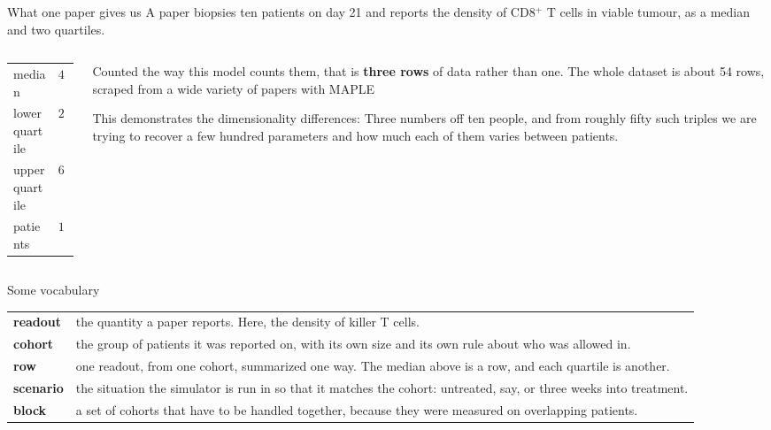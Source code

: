 \documentclass[10pt,aspectratio=169]{beamer}
\newcommand{\term}[1]{\alert{\textbf{#1}}}
\begin{document}
\begin{frame}[t]{What one paper gives us}
  A paper biopsies ten patients on day 21 and reports the density of CD8$^+$
  T cells in viable tumour, as a median and two quartiles.
  \vspace{0.4em}
  \begin{columns}[T]
    \begin{column}{0.33\textwidth}
      \begin{center}\small
      \begin{tabular}{@{}lr@{}}
        \toprule
        median & $4.1$ \\
        lower quartile & $2.8$ \\
        upper quartile & $6.0$ \\
        \midrule
        patients & $10$ \\
        \bottomrule
      \end{tabular}
      \end{center}
    \end{column}
    \begin{column}{0.62\textwidth}
      Counted the way this model counts them, that is \term{three rows} of data
      rather than one. The whole dataset is about 54 rows, scraped from a wide variety of papers with MAPLE
      \vspace{0.5em}

      This demonstrates the dimensionality differences: Three numbers off ten people, and from roughly fifty such triples we are
      trying to recover a few hundred parameters and how much each of them
      varies between patients.
    \end{column}
  \end{columns}
\end{frame}

\begin{frame}[t]{Some vocabulary}
  \begin{block}{}
    \begin{tabularx}{\textwidth}{@{}lX@{}}
      \textbf{readout} & the quantity a paper reports. Here, the density of
        killer T cells. \\[5pt]
      \textbf{cohort} & the group of patients it was reported on, with its own
        size and its own rule about who was allowed in. \\[5pt]
      \textbf{row} & one readout, from one cohort, summarized one way. The
        median above is a row, and each quartile is another. \\[5pt]
      \textbf{scenario} & the situation the simulator is run in so that it
        matches the cohort: untreated, say, or three weeks into treatment. \\[5pt]
      \textbf{block} & a set of cohorts that have to be handled together,
        because they were measured on overlapping patients. \\
    \end{tabularx}
  \end{block}
\end{frame}
\end{document}
